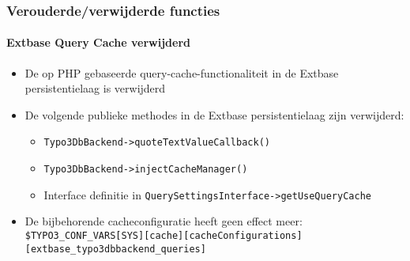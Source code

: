 \begin{frame}[fragile]
	\frametitle{Verouderde/verwijderde functies}
	\framesubtitle{Extbase Query Cache verwijderd}

	\begin{itemize}

		\item De op PHP gebaseerde query-cache-functionaliteit in de Extbase persistentielaag is verwijderd

		\item De volgende publieke methodes in de Extbase persistentielaag zijn verwijderd:

			\begin{itemize}
				\item \small\texttt{Typo3DbBackend->quoteTextValueCallback()}\normalsize
				\item \small\texttt{Typo3DbBackend->injectCacheManager()}\normalsize
				\item Interface definitie in \small\texttt{QuerySettingsInterface->getUseQueryCache}\normalsize
			\end{itemize}

		\item De bijbehorende cacheconfiguratie heeft geen effect meer:\newline
			\smaller
				\texttt{\$TYPO3\_CONF\_VARS[SYS][cache][cacheConfigurations]}\newline
				\tabto{0.4cm}\texttt{[extbase\_typo3dbbackend\_queries]}
			\normalsize

	\end{itemize}

\end{frame}


